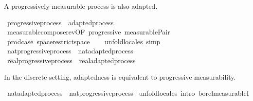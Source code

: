 \begin{isabellebody}
\isamarkupfalse%
%
\begin{isamarkuptext}%
A progressively measurable process is also adapted.%
\end{isamarkuptext}\isamarkuptrue%
\isamarkupfalse%
\ progressive{\isacharunderscore}{\kern0pt}process\ {\isasymsubseteq}\ adapted{\isacharunderscore}{\kern0pt}process%
\isadelimproof
\ %
\endisadelimproof
%
\isatagproof
{}\isamarkupfalse%
\ measurable{\isacharunderscore}{\kern0pt}compose{\isacharunderscore}{\kern0pt}rev{\isacharbrackleft}{\kern0pt}OF\ progressive\ measurable{\isacharunderscore}{\kern0pt}Pair{}{\isacharprime}{\kern0pt}{\isacharbrackright}{\kern0pt}\ \isanewline
\ \ \isamarkupfalse%
\ prod{\isachardot}{\kern0pt}case\ space{\isacharunderscore}{\kern0pt}restrict{\isacharunderscore}{\kern0pt}space\isanewline
\ \ \isamarkupfalse%
\ unfold{\isacharunderscore}{\kern0pt}locales\ simp%
\endisatagproof
{\isafoldproof}%
%
\isadelimproof
%
\endisadelimproof
\isanewline
\isanewline
{}\isamarkupfalse%
\ nat{\isacharunderscore}{\kern0pt}progressive{\isacharunderscore}{\kern0pt}process\ {\isasymsubseteq}\ nat{\isacharunderscore}{\kern0pt}adapted{\isacharunderscore}{\kern0pt}process%
\isadelimproof
\ %
\endisadelimproof
%
\isatagproof
\isacommand{{\isachardot}{\kern0pt}{\isachardot}{\kern0pt}}\isamarkupfalse%
%
\endisatagproof
{\isafoldproof}%
%
\isadelimproof
%
\endisadelimproof
\isanewline
{}\isamarkupfalse%
\ real{\isacharunderscore}{\kern0pt}progressive{\isacharunderscore}{\kern0pt}process\ {\isasymsubseteq}\ real{\isacharunderscore}{\kern0pt}adapted{\isacharunderscore}{\kern0pt}process%
\isadelimproof
\ %
\endisadelimproof
%
\isatagproof
\isacommand{{\isachardot}{\kern0pt}{\isachardot}{\kern0pt}}\isamarkupfalse%
%
\endisatagproof
{\isafoldproof}%
%
\isadelimproof
%
\endisadelimproof
%
\begin{isamarkuptext}%
In the discrete setting, adaptedness is equivalent to progressive measurability.%
\end{isamarkuptext}\isamarkuptrue%
\isamarkupfalse%
\ nat{\isacharunderscore}{\kern0pt}adapted{\isacharunderscore}{\kern0pt}process\ {\isasymsubseteq}\ nat{\isacharunderscore}{\kern0pt}progressive{\isacharunderscore}{\kern0pt}process\isanewline
%
\isadelimproof
%
\endisadelimproof
%
\isatagproof
{}\isamarkupfalse%
\ {\isacharparenleft}{\kern0pt}unfold{\isacharunderscore}{\kern0pt}locales{\isacharcomma}{\kern0pt}\ intro\ borel{\isacharunderscore}{\kern0pt}measurableI{\isacharparenright}{\kern0pt}\isanewline

\end{isabellebody}
